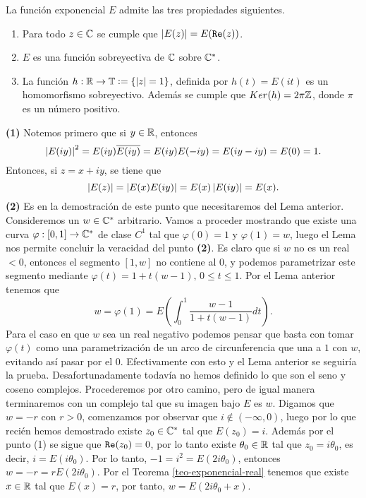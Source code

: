 \begin{theo}\label{teo-propiedades2-exp}
  La función exponencial \(E\) admite las tres propiedades siguientes.
  \begin{enumerate}
    \item Para todo \(z\in \C\) se cumple que \(\abs{E(z)} = E(\Real(z))\).
    \item \(E\) es una función sobreyectiva de \(\C\) sobre \(\C^*\). 
    \item La función \(h: \R \rightarrow \mathbb{T}\vcentcolon = \{\abs{z} = 1\} \), definida por  \(h(t) = E(it) \) es un homomorfismo sobreyectivo. 
    Además se cumple que \( Ker(h) = 2\pi\Z\), donde \(\pi\) es un número positivo.
  \end{enumerate}
\end{theo}
\begin{dem}
   {\bf (1)} Notemos primero que si \(y \in \R \), entonces 
    \[
    \abs{E(iy)}^2 = E(iy)\conj{E(iy)} = E(iy)E(-iy)= E(iy-iy) = E(0) = 1.
    \]
    Entonces, si \(z=x+iy\), se tiene que 
    \[
    \abs{E(z)} = \abs{E(x)E(iy)} = E(x)\abs{E(iy)} = E(x).
    \]
    {\bf (2)} Es en la demostración de este punto que necesitaremos del Lema anterior. 
    Consideremos un \(w \in \C^*\) arbitrario. Vamos a proceder mostrando que existe una
    curva \(\varphi : [0,1] \rightarrow \C^*\) de clase \(C^1\) tal que \(\varphi(0) = 1\)
    y \(\varphi(1) = w\), luego  el Lema nos permite concluir la veracidad del punto {\bf (2)}.
    Es claro que si \(w\) no es un real \(< 0\), entonces el segmento \([1,w]\) no contiene al
    \(0\), y podemos parametrizar este segmento mediante \(\varphi(t) = 1 + t(w-1),\, 0\leq t\leq 1\). Por el Lema anterior
    tenemos que \[w = \varphi(1) = E\left(\int_{0}^{1}\frac{w-1}{1 + t(w-1)}dt\right).\]
    Para el caso en que \(w\) sea un real negativo podemos pensar que basta con tomar \(\varphi(t)\) como una parametrización de un arco
    de circunferencia que una a \(1\) con \(w\), evitando así pasar por el 0. Efectivamente con esto y el Lema anterior se seguiría la prueba. Desafortunadamente 
    todavía no hemos definido lo que son el seno y coseno complejos. Procederemos por otro camino, pero de igual manera terminaremos 
    con un complejo tal que su imagen bajo \(E\) es \(w\).
    Digamos que \(w=-r\) con \(r>0\), comenzamos por observar que \(i \not \in (-\infty, 0)\), 
    luego por lo que recién hemos demostrado existe \(z_0\in \C^*\) tal que \(E(z_0)=i\). 
    Además por el punto (1) se sigue que \(\Real(z_0) = 0\), por lo tanto existe \(\theta_0 \in \R\) tal que \(z_0 = i\theta_0\), 
    es decir, \(i = E(i\theta_0)\).
    Por lo tanto, \(-1 = i^2 = E(2i\theta_0)\), entonces \(w = -r = rE(2i\theta_0)\). Por el Teorema \ref{teo-exponencial-real} tenemos que
    existe \(x\in \R\) tal que \(E(x) = r\), por tanto, \(w = E(2i\theta_0 + x) \). 
    \begin{figure}[H]
        \centering
        \begin{tikzpicture}[scale=1]
        

\end{tikzpicture}
\end{figure}
\end{dem}
